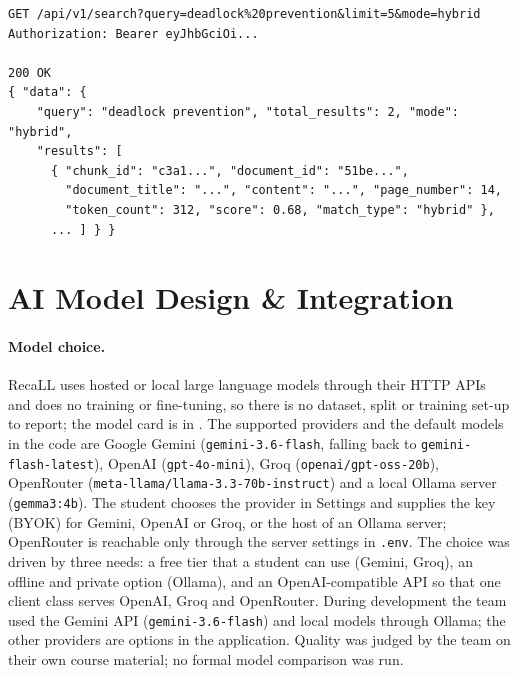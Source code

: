 \begin{lstlisting}[caption={Knowledge search (\texttt{search.py}; \texttt{ResponseEnvelope[SearchResponse]})},label={lst:api_search}]
GET /api/v1/search?query=deadlock%20prevention&limit=5&mode=hybrid
Authorization: Bearer eyJhbGciOi...

200 OK
{ "data": {
    "query": "deadlock prevention", "total_results": 2, "mode": "hybrid",
    "results": [
      { "chunk_id": "c3a1...", "document_id": "51be...",
        "document_title": "...", "content": "...", "page_number": 14,
        "token_count": 312, "score": 0.68, "match_type": "hybrid" },
      ... ] } }
\end{lstlisting}

\section{AI Model Design \& Integration}\label{sec:ai_design}

\paragraph{Model choice.}
RecaLL uses hosted or local large language models through their HTTP APIs and does no
training or fine-tuning, so there is no dataset, split or training set-up to report;
the model card is in . The supported providers and the default models in
the code are Google Gemini (\texttt{gemini-3.6-flash}, falling back to
\texttt{gemini-flash-latest}), OpenAI (\texttt{gpt-4o-mini}), Groq
(\texttt{openai/gpt-oss-20b}), OpenRouter (\texttt{meta-llama/llama-3.3-70b-instruct})
and a local Ollama server (\texttt{gemma3:4b}). The student chooses the provider in
Settings and supplies the key (BYOK) for Gemini, OpenAI or Groq, or the host of an
Ollama server; OpenRouter is reachable only through the server settings in
\texttt{.env}. The choice was driven by three needs:
a free tier that a student can use (Gemini, Groq), an offline and private option
(Ollama), and an OpenAI-compatible API so that one client class serves OpenAI, Groq and
OpenRouter. During development the team used the Gemini API (\texttt{gemini-3.6-flash})
and local models through Ollama; the other providers are options in the application.
Quality was judged by the team on their own course material; no formal model comparison
was run.

